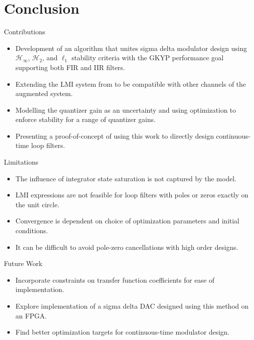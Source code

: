 \documentclass[10pt,usenames,dvipsnames]{beamer}
\begin{document}
\section{Conclusion}

\begin{frame}{Contributions}

\begin{itemize}
	\item Development of an algorithm that unites sigma delta modulator design using $\mathcal{H}_\infty$, $\mathcal{H}_2$, and $\ell_1$ stability criteria with the GKYP performance goal supporting both FIR and IIR filters. \pause
	\item Extending the LMI system from \cite{Li2014} to be compatible with other channels of the augmented system. \pause
	\item Modelling the quantizer gain as an uncertainty and using optimization to enforce stability for a range of quantizer gains. \pause
	\item Presenting a proof-of-concept of using this work to directly design continuous-time loop filters.
\end{itemize}

\end{frame}

\begin{frame}{Limitations}

\begin{itemize}
	\item The influence of integrator state saturation is not captured by the model. \pause
	\item LMI expressions are not feasible for loop filters with poles or zeros exactly on the unit circle. \pause
	\item Convergence is dependent on choice of optimization parameters and initial conditions. \pause
	\item It can be difficult to avoid pole-zero cancellations with high order designs.
\end{itemize}

\end{frame}

\begin{frame}{Future Work}

\begin{itemize}
	\item Incorporate constraints on transfer function coefficients for ease of implementation. \pause
	\item Explore implementation of a sigma delta DAC designed using this method on an FPGA. \pause
	\item Find better optimization targets for continuous-time modulator design.
\end{itemize}

\end{frame}
\end{document}
